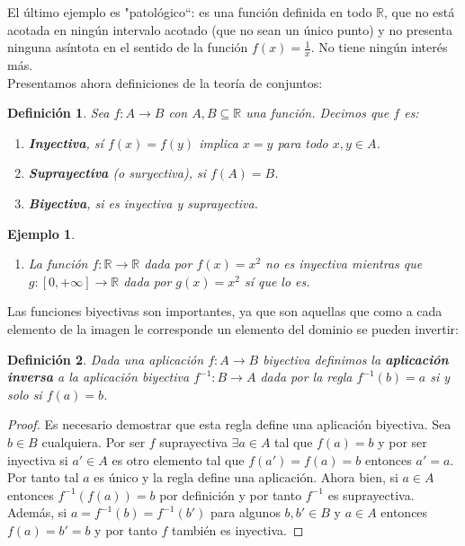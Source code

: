 \documentclass{article}
\newtheorem{define}{Definición}
\newtheorem{ejem}{Ejemplo}
\newcommand{\reales}{\mathbb{R}}
\begin{document}
El último ejemplo es "patológico``: es una función definida en todo $\reales$, que no está acotada en ningún intervalo acotado (que no sean un único punto) y no presenta ninguna asíntota en el sentido de la función $f(x) = \frac{1}{x}$. No tiene ningún interés más.\\ 
Presentamos ahora definiciones de la teoría de conjuntos:
\begin{define}
	Sea $f:A \rightarrow B$ con $A,B \subseteq \reales$ una función. Decimos que $f$ es:
	\begin{enumerate}
		\item
		\textbf{Inyectiva}, sí $f(x) = f(y)$ implica $x = y$ para todo $x,y \in A$.
		\item
		\textbf{Suprayectiva} (o suryectiva), si $f(A) = B$.
		\item
		\textbf{Biyectiva}, si es inyectiva y suprayectiva.
	\end{enumerate}
\end{define}

\begin{ejem}
	\begin{enumerate}
		\item
		La función $f: \reales \rightarrow \reales$ dada por $f(x) = x^2$ no es inyectiva mientras que $g: [0, +\infty] \rightarrow \reales$ dada por $g(x) = x^2$ sí que lo es.
	\end{enumerate}
\end{ejem}

Las funciones biyectivas son importantes, ya que son aquellas que como a cada elemento de la imagen le corresponde un elemento del dominio se pueden invertir:
\begin{define}
	Dada una aplicación $f: A \rightarrow B$ biyectiva definimos la \textbf{aplicación inversa} a la aplicación biyectiva $f^{-1}: B \rightarrow A$ dada por la regla $f^{-1}(b) = a$ si y solo si $f(a) = b$.
\end{define}
\begin{proof}
	Es necesario demostrar que esta regla define una aplicación biyectiva. Sea $b \in B$ cualquiera. Por ser $f$ suprayectiva $\exists a \in A$ tal que $f(a) = b$ y por ser inyectiva si $a' \in A$ es otro elemento tal que $f(a') = f(a) = b$ entonces $a' = a$. Por tanto tal $a$ es único y la regla define una aplicación. Ahora bien, si $a \in A$ entonces $f^{-1}(f(a)) = b$ por definición y por tanto $f^{-1}$ es suprayectiva. Además, si $a = f^{-1}(b) = f^{-1}(b')$ para algunos $b, b' \in B$ y $a \in A$ entonces $f(a) = b' = b$ y por tanto $f$ también es inyectiva.
\end{proof}
\end{document}
